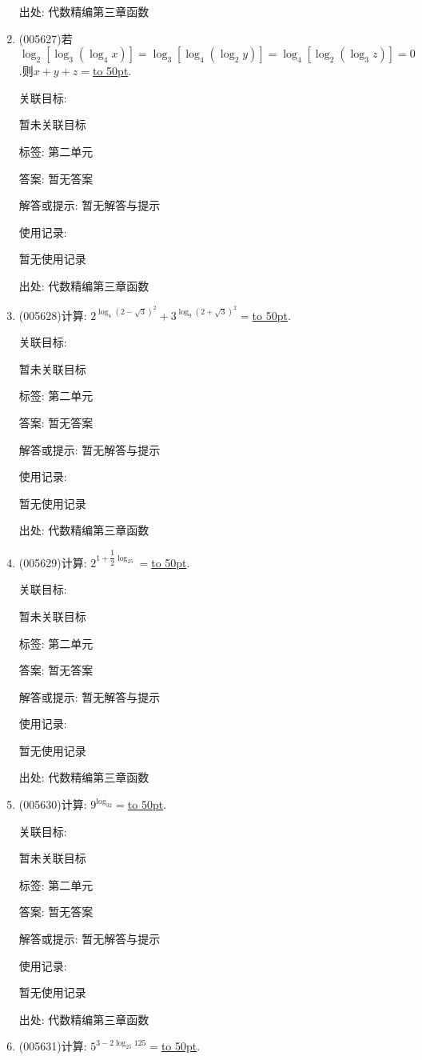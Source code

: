 \documentclass[10pt,a4paper]{article}
\newcommand{\blank}[1]{\underline{\hbox to #1pt{}}}
\begin{document}
\begin{enumerate}[1.]
出处: 代数精编第三章函数
\item { (005627)}若$\log_2[\log_3(\log_4x)]=\log_3[\log_4(\log_2y)]=\log_4[\log_2(\log_3z)]=0$.则$x+y+z=$\blank{50}.


关联目标:

暂未关联目标



标签: 第二单元

答案: 暂无答案

解答或提示: 暂无解答与提示

使用记录:

暂无使用记录


出处: 代数精编第三章函数
\item { (005628)}计算: $2^{\log_4(2-\sqrt 3)^2}+3^{\log_9(2+\sqrt 3)^2}=$\blank{50}.


关联目标:

暂未关联目标



标签: 第二单元

答案: 暂无答案

解答或提示: 暂无解答与提示

使用记录:

暂无使用记录


出处: 代数精编第三章函数
\item { (005629)}计算: $2^{1+\dfrac 12\log_25}=$\blank{50}.


关联目标:

暂未关联目标



标签: 第二单元

答案: 暂无答案

解答或提示: 暂无解答与提示

使用记录:

暂无使用记录


出处: 代数精编第三章函数
\item { (005630)}计算: $9^{\log_32}=$\blank{50}.


关联目标:

暂未关联目标



标签: 第二单元

答案: 暂无答案

解答或提示: 暂无解答与提示

使用记录:

暂无使用记录


出处: 代数精编第三章函数
\item { (005631)}计算: $5^{3-2\log_{25}125}=$\blank{50}.



\end{enumerate}
\end{document}
